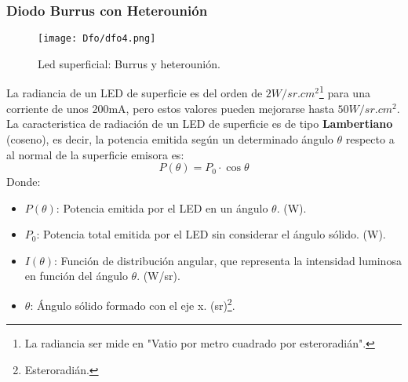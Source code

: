 \documentclass[
	12pt, %
	fleqn, %
	a4paper, %
	oneside, %
]{LegrandOrangeBook}
\begin{document}
\subsubsection*{Diodo Burrus con Heterounión}
\begin{figure}[H]
\centering
\texttt{[image: Dfo/dfo4.png]}
\caption{Led superficial: Burrus y heterounión.}
\end{figure}
La radiancia de un LED de superficie es del orden de $2W/sr.cm^2$\footnote{La radiancia ser mide en "Vatio por metro cuadrado por esteroradián".} para una corriente de unos 200mA, pero estos valores pueden mejorarse hasta $50W/sr.cm^2$. La caracteristica de radiación de un LED de superficie es de tipo \textbf{Lambertiano} (coseno), es decir, la potencia emitida según un determinado ángulo $\theta$ respecto a al normal de la superficie emisora es:
\begin{equation}
P(\theta)=P_0\cdot\cos\theta
\end{equation}
Donde:
\begin{itemize}
\item $P(\theta)$: Potencia emitida por el LED en un ángulo $\theta$. (W).
\item $P_0$: Potencia total emitida por el LED sin considerar el ángulo sólido. (W).
\item $I(\theta)$: Función de distribución angular, que representa la intensidad luminosa en función del ángulo $\theta$.  (W/sr).
\item $\theta$: Ángulo sólido formado con el eje x. (sr)\footnote{Esteroradián.}.
\end{itemize}
\end{document}
